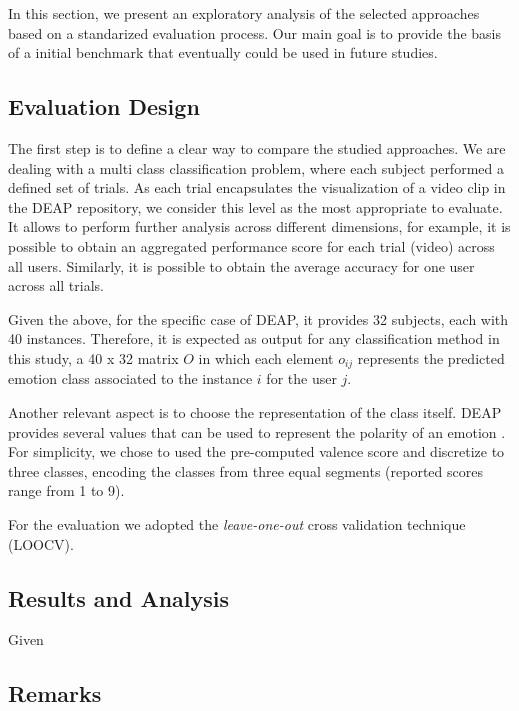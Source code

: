 \documentclass{sig-alternate}
\begin{document}
In this section, we present an  exploratory 
analysis of the selected approaches based on a standarized
evaluation process. Our main goal is to provide the basis
of a initial benchmark that eventually could be used in future
studies.

\subsection{ Evaluation Design} 

The first step is to define a clear way to compare the 
studied approaches. We are dealing with a multi class classification
problem, where  each subject performed a defined set of trials. As
each trial encapsulates the visualization of a video clip in the DEAP 
repository, we consider
this level as the most appropriate to evaluate. It allows to perform 
further analysis across different dimensions, for example, it is possible
to obtain an aggregated performance score for each  trial (video) across all users. Similarly, it is possible to obtain the average accuracy for one 
user across all trials.

Given the above,  for the specific case of DEAP, it provides 32 subjects, 
each with 40 instances. Therefore, it is expected as output for any classification method in this study, a  40 x 32 matrix  $O$ in  which each element $o_{ij}$ represents the predicted emotion class associated to the instance $i$ for the user $j$.
 
Another relevant aspect is to choose the representation of the class itself. DEAP provides several  values that can be used to 
represent the polarity of an emotion . For simplicity, we chose to used 
the pre-computed valence score  and discretize to three classes, 
encoding the classes from three equal segments (reported scores
range from 1 to 9). 

For the evaluation we adopted the \emph{leave-one-out} cross validation technique (LOOCV).




\subsection{ Results and Analysis}

Given 



\subsection{Remarks}
\end{document}
